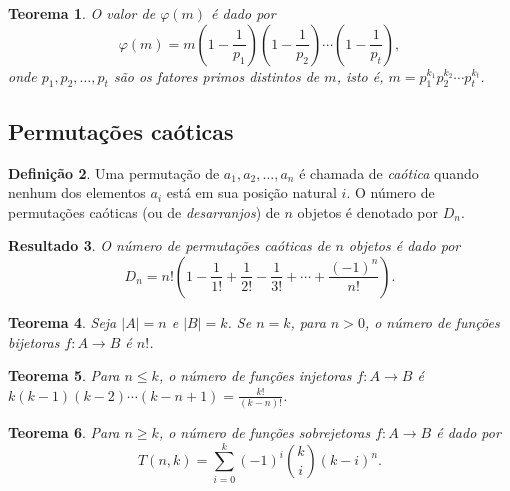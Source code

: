 \documentclass{article}
\theoremstyle{plain}
\newtheorem{thm}{Teorema}[section]
\newtheorem{res}[thm]{Resultado}
\theoremstyle{definition}
\newtheorem{defn}[thm]{Definição}
\theoremstyle{remark}
\begin{document}
\begin{thm}
    O valor de \(\varphi(m)\) é dado por
    \begin{equation}
        \varphi(m) = m \left( 1 - \frac{1}{p_1} \right) \left( 1 - \frac{1}{p_2} \right) \cdots \left( 1 - \frac{1}{p_t} \right),
    \end{equation}
    \noindent onde \(p_1, p_2, \ldots, p_t\) são os fatores primos distintos de \(m\), isto é, \(m = p_1^{k_1} p_2^{k_2} \cdots p_t^{k_t}\).
\end{thm}

\subsection{Permutações caóticas}

\begin{defn}
    Uma permutação de \(a_1, a_2, \ldots, a_n\) é chamada de \emph{caótica} quando nenhum dos elementos \(a_i\) está em sua posição natural \(i\). O número de permutações caóticas (ou de \emph{desarranjos}) de \(n\) objetos é denotado por \(D_n\).
\end{defn}

\begin{res}
    O número de permutações caóticas de \(n\) objetos é dado por
    \begin{equation}
        D_n = n! \left( 1 - \frac{1}{1!} + \frac{1}{2!} - \frac{1}{3!} + \cdots + \frac{(-1)^n}{n!} \right).
    \end{equation}
\end{res}

\begin{thm}
    Seja \(\vert A \vert = n\) e \(\vert B \vert = k\). Se \(n=k\), para \(n>0\), o número de funções bijetoras \(f: A \to B\) é \(n!\).
\end{thm}

\begin{thm}
    Para \(n \leq k\), o número de funções injetoras \(f: A \to B\) é \(k(k-1)(k-2)\cdots(k-n+1) = \displaystyle\frac{k!}{(k-n)!}\).
\end{thm}

\begin{thm}
    Para \(n \geq k\), o número de funções sobrejetoras \(f: A \to B\) é dado por
    \begin{equation}
        T(n,k) = \sum_{i=0}^{k} (-1)^i \binom{k}{i} (k-i)^n.
    \end{equation}
\end{thm}
\end{document}
